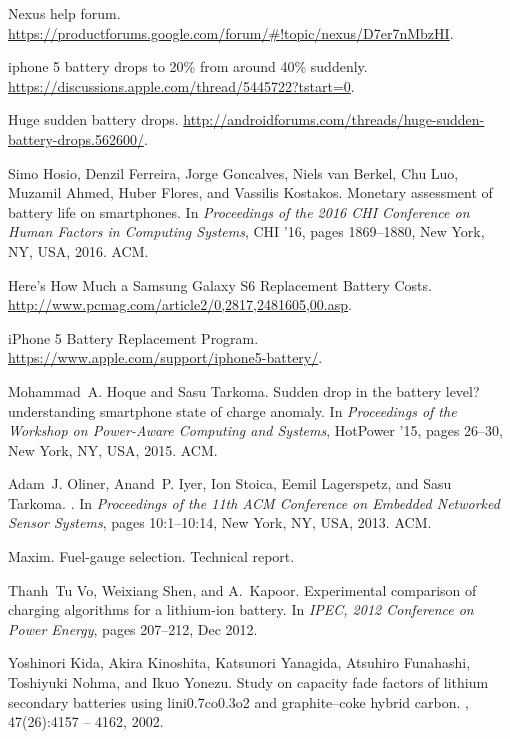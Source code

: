 \documentclass[journal]{IEEEtran}
\begin{document}
\begin{thebibliography}{10}

Nexus help forum.
\newblock
  \url{https://productforums.google.com/forum/#!topic/nexus/D7er7nMbzHI}.

iphone 5 battery drops to 20\% from around 40\% suddenly.
\newblock \url{https://discussions.apple.com/thread/5445722?tstart=0}.

Huge sudden battery drops.
\newblock
  \url{http://androidforums.com/threads/huge-sudden-battery-drops.562600/}.

Simo Hosio, Denzil Ferreira, Jorge Goncalves, Niels van Berkel, Chu Luo,
  Muzamil Ahmed, Huber Flores, and Vassilis Kostakos.
\newblock Monetary assessment of battery life on smartphones.
\newblock In {\em Proceedings of the 2016 CHI Conference on Human Factors in
  Computing Systems}, CHI '16, pages 1869--1880, New York, NY, USA, 2016. ACM.

{Here's How Much a Samsung Galaxy S6 Replacement Battery Costs}.
\newblock \url{http://www.pcmag.com/article2/0,2817,2481605,00.asp}.

{iPhone 5 Battery Replacement Program}.
\newblock \url{https://www.apple.com/support/iphone5-battery/}.

Mohammad~A. Hoque and Sasu Tarkoma.
\newblock Sudden drop in the battery level? understanding smartphone state of
  charge anomaly.
\newblock In {\em Proceedings of the Workshop on Power-Aware Computing and
  Systems}, HotPower '15, pages 26--30, New York, NY, USA, 2015. ACM.

Adam~J. Oliner, Anand~P. Iyer, Ion Stoica, Eemil Lagerspetz, and Sasu Tarkoma.
.
\newblock In {\em Proceedings of the 11th ACM Conference on Embedded Networked
  Sensor Systems}, pages 10:1--10:14, New York, NY, USA, 2013. ACM.

Maxim.
\newblock Fuel-gauge selection.
\newblock Technical report.

Thanh~Tu Vo, Weixiang Shen, and A.~Kapoor.
\newblock Experimental comparison of charging algorithms for a lithium-ion
  battery.
\newblock In {\em IPEC, 2012 Conference on Power Energy}, pages 207--212, Dec
  2012.

Yoshinori Kida, Akira Kinoshita, Katsunori Yanagida, Atsuhiro Funahashi,
  Toshiyuki Nohma, and Ikuo Yonezu.
\newblock Study on capacity fade factors of lithium secondary batteries using
  lini0.7co0.3o2 and graphite–coke hybrid carbon.
, 47(26):4157 -- 4162, 2002.


\end{thebibliography}
\end{document}
